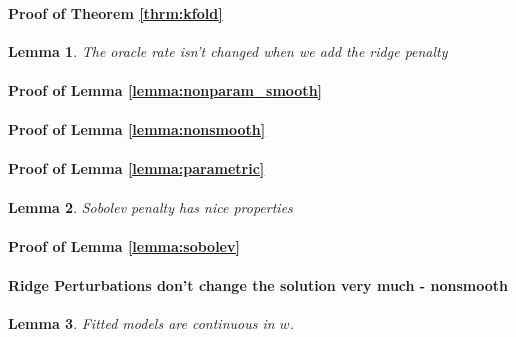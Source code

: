 \documentclass[12pt]{article}
\newtheorem{lemma}{Lemma}
\begin{document}
\paragraph{Proof of Theorem \ref{thrm:kfold}}

\begin{lemma}
\label{oracle_maintained}
The oracle rate isn't changed when we add the ridge penalty
\end{lemma}

\paragraph{Proof of Lemma \ref{lemma:nonparam_smooth}}
\paragraph{Proof of Lemma \ref{lemma:nonsmooth}}

\paragraph{Proof of Lemma \ref{lemma:parametric}}

\begin{lemma}
\label{lemma:sobolev_prop}
Sobolev penalty has nice properties
\end{lemma}

\paragraph{Proof of Lemma \ref{lemma:sobolev}}

\paragraph{Ridge Perturbations don't change the solution very much - nonsmooth}
\begin{lemma}
	\label{lemma:ridge_perturb_nonsmooth}
	Fitted models are continuous in $w$.
\end{lemma}

\bigskip



\end{document}
